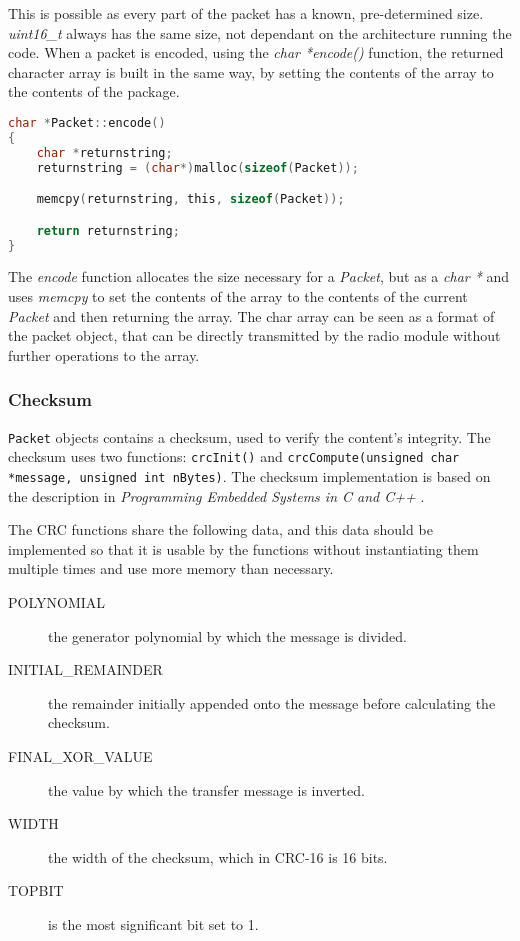 This is possible as every part of the packet has a known, pre-determined size. \textit{uint16\_t} always has the same size, not dependant on the architecture running the code. When a packet is encoded, using the \textit{char *encode()} function, the returned character array is built in the same way, by setting the contents of the array to the contents of the package.

\begin{lstlisting}[language=C]
char *Packet::encode()
{
    char *returnstring;
    returnstring = (char*)malloc(sizeof(Packet));

    memcpy(returnstring, this, sizeof(Packet));

    return returnstring;
}
\end{lstlisting}
The \textit{encode} function allocates the size necessary for a \textit{Packet}, but as a \textit{char *} and uses \textit{memcpy} to set the contents of the array to the contents of the current \textit{Packet} and then returning the array. The char array can be seen as a format of the packet object, that can be directly transmitted by the radio module without further operations to the array.

\subsubsection{Checksum}
\texttt{Packet} objects contains a checksum, used to verify the content's integrity. The checksum uses two functions: \texttt{crcInit()} and \texttt{crcCompute(unsigned char *message, unsigned int nBytes)}. The checksum implementation is based on the description in \textit{Programming Embedded Systems in C and C++} \cite{crcCode}.

The CRC functions share the following data, and this data should be implemented so that it is usable by the functions without instantiating them multiple times and use more memory than necessary.

\begin{description}
	\item[POLYNOMIAL] the generator polynomial by which the message is divided.
	\item[INITIAL\_REMAINDER] the remainder initially appended onto the message before calculating the checksum.
	\item[FINAL\_XOR\_VALUE] the value by which the transfer message is inverted.
	\item[WIDTH] the width of the checksum, which in CRC-16 is 16 bits.
	\item[TOPBIT] is the most significant bit set to 1.
\end{description}

